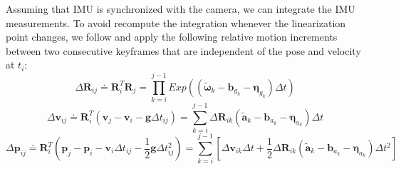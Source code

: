 \documentclass[journal,article,submit,moreauthors,pdftex]{Definitions/mdpi}
\begin{document}

Assuming that IMU is synchronized with the camera, we can integrate the 
IMU measurements. 
To avoid recompute the integration whenever the linearization point 
changes, we follow \cite{forsterOnManifoldPreintegrationRealTime2017} 
and apply the following relative motion increments between two 
consecutive keyframes that are independent of the pose and velocity 
at $t_i$:
\begin{equation}
	\Delta{\boldsymbol{R}_{ij}} \doteq \boldsymbol{R}_i^T \boldsymbol{R}_j = \prod_{k=i}^{j-1} Exp \left((\widetilde{\boldsymbol{\omega}}_k - \boldsymbol{b}_{g_k} - \boldsymbol{\eta}_{g_k}) \Delta{t} \right)
\end{equation}
\begin{equation}
	\Delta{\boldsymbol{v}_{ij}} \doteq \boldsymbol{R}_i^T(\boldsymbol{v}_j-\boldsymbol{v}_i-\boldsymbol{g}\Delta{t_{ij}}) = \sum_{k=i}^{j-1}\Delta{\boldsymbol{R}_{ik}} \left( \widetilde{\boldsymbol{a}}_k - \boldsymbol{b}_{a_k} - \boldsymbol{\eta}_{a_k} \right) \Delta{t}
\end{equation}
\begin{equation}
	\Delta{\boldsymbol{p}_{ij}} \doteq \boldsymbol{R}_i^T(\boldsymbol{p}_j-\boldsymbol{p}_i-\boldsymbol{v}_i\Delta{t_{ij}}-\frac{1}{2}\boldsymbol{g}\Delta{t_{ij}^2}) = \sum_{k=i}^{j-1} \left[ \Delta{\boldsymbol{v}_{ik}}\Delta{t} + \frac{1}{2}\Delta{\boldsymbol{R}_{ik}}(\widetilde{\boldsymbol{a}}_k - \boldsymbol{b}_{a_k} - \boldsymbol{\eta}_{a_k})\Delta{t}^2 \right] 
\end{equation}
\end{document}
